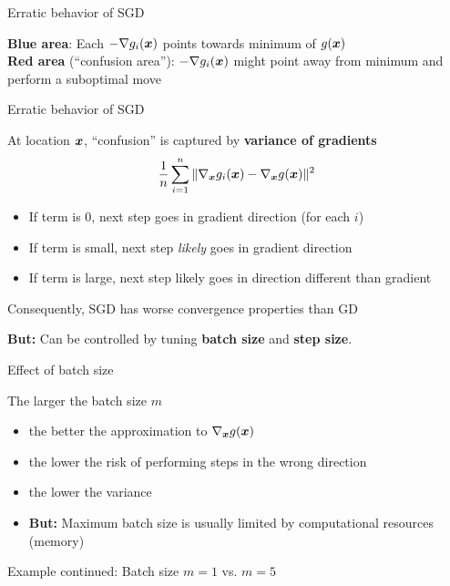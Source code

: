 \documentclass[11pt,compress,t,notes=noshow, xcolor=table]{beamer}
\begin{document}
\begin{framei}{Erratic behavior of SGD}
\item[]
\begin{center}\begin{small}
\textbf{Blue area}: Each $-\nabla g_i(\bm{x})$ points towards minimum of $g(\bm{x})$ \\
\textbf{Red area} (\enquote{confusion area}): $-\nabla g_i(\bm{x})$ might point away from minimum and perform a suboptimal move
\end{small} \end{center}
\end{framei}

\begin{framei}{Erratic behavior of SGD}
\item At location $\bm{x}$, \enquote{confusion} is captured by \textbf{variance of gradients}
$$
\frac{1}{n}\sum\limits_{i=1}^n \|\nabla_{\bm{x}} g_i(\bm{x}) - \nabla_{\bm{x}} g(\bm{x})\|^2
$$
\begin{itemize}
    \item If term is $0$, next step goes in gradient direction (for each $i$)
    \item If term is small, next step \emph{likely} goes in gradient direction
    \item If term is large, next step likely goes in direction different than gradient
\end{itemize}
\item Consequently, SGD has worse convergence properties than GD
\item \textbf{But:} Can be controlled by tuning \textbf{batch size} and \textbf{step size}.
\end{framei}

\begin{framei}{Effect of batch size}
\item The larger the batch size $m$
\begin{itemize}
    \item the better the approximation to $\nabla_{\bm{x}} g(\bm{x})$
    \item the lower the risk of performing steps in the wrong direction
    \item the lower the variance
    \item \textbf{But:} Maximum batch size is usually limited by computational resources (memory)
\end{itemize}
\vfill
{}
\begin{center}\begin{small}
Example continued: Batch size $m = 1$ vs. $m = 5$
\end{small} \end{center}
\end{framei}
\end{document}
